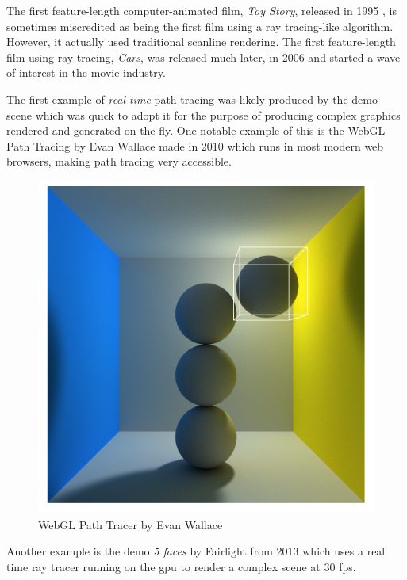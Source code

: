 \documentclass[
  twoside,
  11pt, a4paper,
  footinclude=true,
  headinclude=true,
  cleardoublepage=empty
]{scrreprt}
\begin{document}
The first feature-length computer-animated film,
\textit{Toy Story}, released in 1995 \cite{wiki:toy-story}, is sometimes miscredited as being the
first film using a ray tracing-like algorithm. However, it actually used traditional scanline
rendering. The first feature-length film using ray tracing, \textit{Cars}, was released much later,
in 2006 \cite{wiki:cars} \cite{inproceedings:cars} and started a wave of interest in the movie industry.

The first example of \emph{real time} path tracing was likely produced by the demo scene
\cite{wiki:demoscene} which was quick to adopt it \cite{site:realtime-radiosity-demos}
for the purpose of producing complex graphics rendered and generated on the fly. One notable
example of this is the WebGL Path Tracing by Evan Wallace made in 2010
\cite{site:webgl-path-tracing} which runs in most modern web browsers, making path tracing very
accessible.

\begin{figure}[H]
    \includegraphics[scale=0.4]{webgl-pathtracer}
    \centering
    \caption{WebGL Path Tracer by Evan Wallace}
    \label{fig:webgl-pathtracer}
\end{figure}

Another example is the demo \textit{5 faces} by Fairlight from 2013
\cite{wiki:5faces-fairlight} which
uses a real time ray tracer running on the \acs{gpu} to render a complex scene at 30 \acs{fps}.
\end{document}
